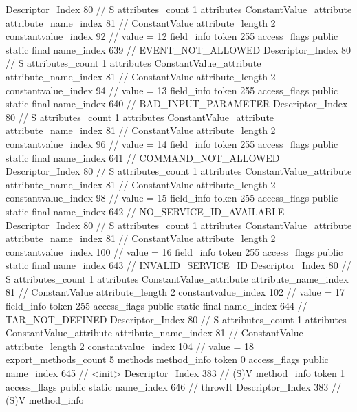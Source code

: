 {{{{{				Descriptor_Index	80		// S
				attributes_count	1
				attributes {
				ConstantValue_attribute {
					attribute_name_index	81		// ConstantValue
					attribute_length	2
					constantvalue_index	92		// value = 12
				}
				}
			}
			field_info {
				token	255
				access_flags	public static final
				name_index	639		// EVENT_NOT_ALLOWED
				Descriptor_Index	80		// S
				attributes_count	1
				attributes {
				ConstantValue_attribute {
					attribute_name_index	81		// ConstantValue
					attribute_length	2
					constantvalue_index	94		// value = 13
				}
				}
			}
			field_info {
				token	255
				access_flags	public static final
				name_index	640		// BAD_INPUT_PARAMETER
				Descriptor_Index	80		// S
				attributes_count	1
				attributes {
				ConstantValue_attribute {
					attribute_name_index	81		// ConstantValue
					attribute_length	2
					constantvalue_index	96		// value = 14
				}
				}
			}
			field_info {
				token	255
				access_flags	public static final
				name_index	641		// COMMAND_NOT_ALLOWED
				Descriptor_Index	80		// S
				attributes_count	1
				attributes {
				ConstantValue_attribute {
					attribute_name_index	81		// ConstantValue
					attribute_length	2
					constantvalue_index	98		// value = 15
				}
				}
			}
			field_info {
				token	255
				access_flags	public static final
				name_index	642		// NO_SERVICE_ID_AVAILABLE
				Descriptor_Index	80		// S
				attributes_count	1
				attributes {
				ConstantValue_attribute {
					attribute_name_index	81		// ConstantValue
					attribute_length	2
					constantvalue_index	100		// value = 16
				}
				}
			}
			field_info {
				token	255
				access_flags	public static final
				name_index	643		// INVALID_SERVICE_ID
				Descriptor_Index	80		// S
				attributes_count	1
				attributes {
				ConstantValue_attribute {
					attribute_name_index	81		// ConstantValue
					attribute_length	2
					constantvalue_index	102		// value = 17
				}
				}
			}
			field_info {
				token	255
				access_flags	public static final
				name_index	644		// TAR_NOT_DEFINED
				Descriptor_Index	80		// S
				attributes_count	1
				attributes {
				ConstantValue_attribute {
					attribute_name_index	81		// ConstantValue
					attribute_length	2
					constantvalue_index	104		// value = 18
				}
				}
			}
			}
			export_methods_count	5
			methods {
				method_info {
					token	0
					access_flags	public
					name_index	645		// <init>
					Descriptor_Index	383		// (S)V
				}
				method_info {
					token	1
					access_flags	public static
					name_index	646		// throwIt
					Descriptor_Index	383		// (S)V
				}
				method_info {
}}}}}
